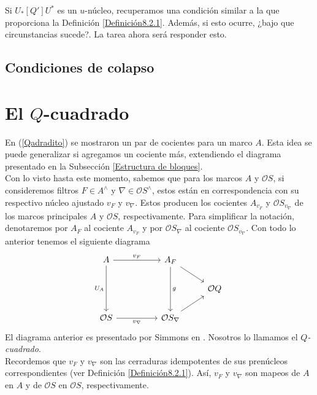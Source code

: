 Si $U_*[Q']U^*$ es un $u$-núcleo, recuperamos una condición similar a la que proporciona la Definición \ref{Definición8.2.1}. Además, si esto ocurre, ¿bajo que circunstancias 
sucede?. La tarea ahora será responder esto.\\

\subsection{Condiciones de colapso}\label{Intervalos colapsados}

\section{El $Q$-cuadrado}\label{Qcuadrado}
En (\ref{Qadradito}) se mostraron un par de cocientes para un marco $A$. Esta idea se puede generalizar si 
agregamos un cociente más, extendiendo el diagrama presentado en la Subsección \ref{Estructura de bloques}.\\

Con lo visto hasta este momento, sabemos que para los marcos $A$ y $\mathcal{O}S$, si consideremos filtros $F\in A^\wedge$ y $\nabla\in \mathcal{O}S^\wedge$, estos están en correspondencia con su respectivo núcleo ajustado
$v_F$ y $v_\nabla$. Estos producen los cocientes $A_{v_F}$ y $\mathcal{O}S_{v_\nabla}$ de los marcos principales $A$ y $\mathcal{O}S$, respectivamente. Para simplificar la notación, denotaremos por $A_F$ al cociente $A_{v_F}$ 
y por $\mathcal{O}S_\nabla$ al cociente $\mathcal{O}S_{v_\nabla}$. Con todo lo anterior tenemos el siguiente diagrama
\begin{equation}\label{Qadrado}
\begin{tikzcd}
	A && {A_F} \\
	&&& {\mathcal{O}Q} \\
	{\mathcal{O}S} && {\mathcal{O}S_\nabla}
	\arrow["{v_F}", from=1-1, to=1-3]
	\arrow["{U_A}"', from=1-1, to=3-1]
	\arrow[from=1-3, to=2-4]
	\arrow["g", from=1-3, to=3-3]
	\arrow["{v_\nabla}"', from=3-1, to=3-3]
	\arrow[from=3-3, to=2-4]
\end{tikzcd}
\end{equation}
El diagrama anterior es presentado por Simmons en \cite{H.S.V}. Nosotros lo llamamos el \emph{$Q$-cuadrado}.\\

Recordemos que $v_F$ y $v_\nabla$ son las cerraduras idempotentes de sus prenúcleos correspondientes (ver Definición \ref{Definición8.2.1}). Así, $v_F$ y $v_\nabla$ son mapeos de $A$ en $A$ y de $\mathcal{O}S$ en $\mathcal{O}S$, respectivamente.\\

